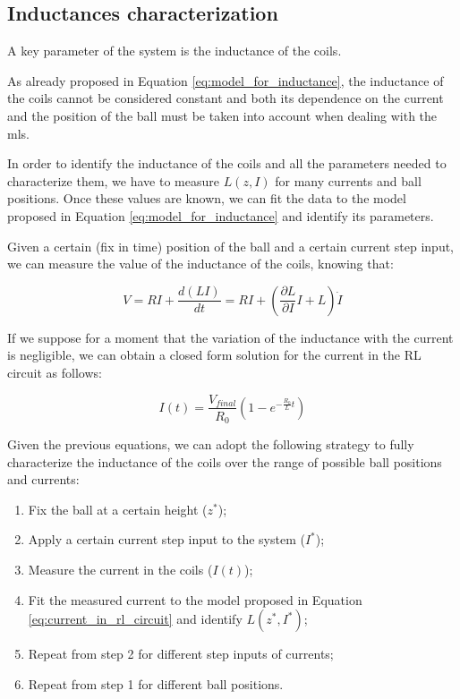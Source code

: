 \subsection{Inductances characterization}
\label{subsec:inductances_characterization}

A key parameter of the system is the inductance of the coils.

As already proposed in Equation \ref{eq:model_for_inductance}, the inductance of the coils cannot be considered constant and both its dependence on the current and the position of the ball must be taken into account when dealing with the \acrshort{mls}.

In order to identify the inductance of the coils and all the parameters needed to characterize them, we have to measure $L(z, I)$ for many currents and ball positions.
Once these values are known, we can fit the data to the model proposed in Equation \ref{eq:model_for_inductance} and identify its parameters.

Given a certain (fix in time) position of the ball and a certain current step input, we can measure the value of the inductance of the coils, knowing that:

\begin{equation}
    V = R I + \frac{d (L I)}{d t} = R I + \left( \frac{\partial L}{\partial I} I + L \right) \dot{I}
\end{equation}

If we suppose for a moment that the variation of the inductance with the current is negligible, we can obtain a closed form solution for the current in the RL circuit as follows:

\begin{equation}
    I(t) = \frac{V_{final}}{R_0} \left( 1 - e^{- \frac{R_0}{L} t} \right)
    \label{eq:current_in_rl_circuit}
\end{equation}

Given the previous equations, we can adopt the following strategy to fully characterize the inductance of the coils over the range of possible ball positions and currents:

\begin{enumerate}
    \item Fix the ball at a certain height ($z^*$);
    \item Apply a certain current step input to the system ($I^*$);
    \item Measure the current in the coils ($I(t)$);
    \item Fit the measured current to the model proposed in Equation \ref{eq:current_in_rl_circuit} and identify $L(z^*, I^*)$;
    \item Repeat from step 2 for different step inputs of currents;
    \item Repeat from step 1 for different ball positions.
\end{enumerate}

